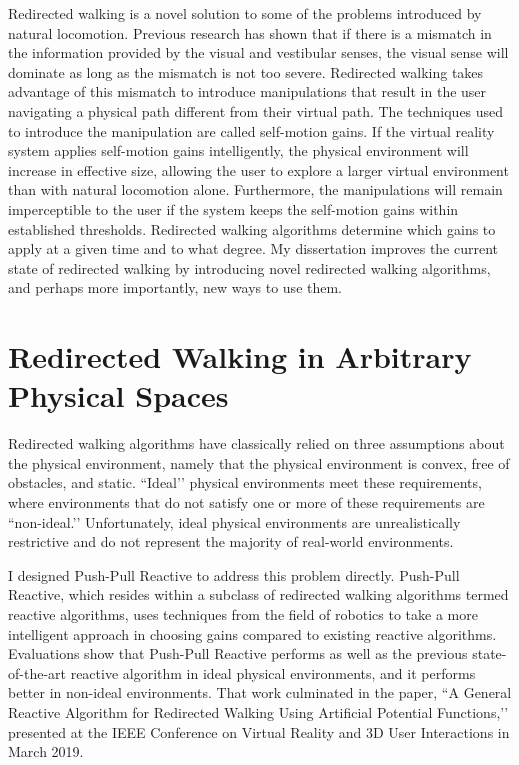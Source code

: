 Redirected walking is a novel solution to some of the problems introduced by natural locomotion. Previous research has shown that if there is a mismatch in the information provided by the visual and vestibular senses, the visual sense will dominate as long as the mismatch is not too severe. Redirected walking takes advantage of this mismatch to introduce manipulations that result in the user navigating a physical path different from their virtual path. The techniques used to introduce the manipulation are called self-motion gains. If the virtual reality system applies self-motion gains intelligently, the physical environment will increase in effective size, allowing the user to explore a larger virtual environment than with natural locomotion alone. Furthermore, the manipulations will remain imperceptible to the user if the system keeps the self-motion gains within established thresholds. Redirected walking algorithms determine which gains to apply at a given time and to what degree. My dissertation improves the current state of redirected walking by introducing novel redirected walking algorithms, and perhaps more importantly, new ways to use them.


\section*{Redirected Walking in Arbitrary Physical Spaces}
\vspace{-0.5cm}
Redirected walking algorithms have classically relied on three assumptions about the physical environment, namely that the physical environment is convex, free of obstacles, and static. ``Ideal’’ physical environments meet these requirements, where environments that do not satisfy one or more of these requirements are ``non-ideal.’’ Unfortunately, ideal physical environments are unrealistically restrictive and do not represent the majority of real-world environments.

I designed Push-Pull Reactive to address this problem directly. Push-Pull Reactive, which resides within a subclass of redirected walking algorithms termed reactive algorithms, uses techniques from the field of robotics to take a more intelligent approach in choosing gains compared to existing reactive algorithms. Evaluations show that Push-Pull Reactive performs as well as the previous state-of-the-art reactive algorithm in ideal physical environments, and it performs better in non-ideal environments. That work culminated in the paper, ``A General Reactive Algorithm for Redirected Walking Using Artificial Potential Functions,’’ presented at the IEEE Conference on Virtual Reality and 3D User Interactions in March 2019.


